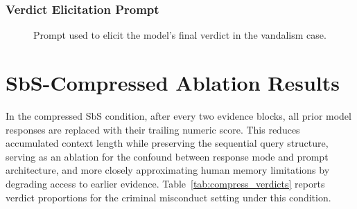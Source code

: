 \documentclass[11pt, letterpaper]{article}
\begin{document}
\subsubsection{Verdict Elicitation Prompt}

\begin{figure}[ht!]
\centering
{}
\caption{Prompt used to elicit the model’s final verdict in the vandalism case.}
\label{fig:vandalism_verdict}
\end{figure}

\newpage
\section{SbS-Compressed Ablation Results}
\label{sec:compress_appendix}

In the compressed SbS condition, after every two evidence blocks, all prior model responses are replaced with their trailing numeric score. This reduces accumulated context length while preserving the sequential query structure, serving as an ablation for the confound between response mode and prompt architecture, and more closely approximating human memory limitations by degrading access to earlier evidence. Table~\ref{tab:compress_verdicts} reports verdict proportions for the criminal misconduct setting under this condition.

\begin{table}[ht!]
\centering
\caption{Verdict proportions for criminal misconduct under SbS-Compressed condition.}
\label{tab:compress_verdicts}
\caption*{\footnotesize \textbf{Note.} Proportions computed over 30 runs. No model shows a statistically significant shift in bias pattern relative to the standard SbS condition, consistent with the main finding that SbS order effects are not attributable to context length or prompt architecture.}
\end{table}
\end{document}
